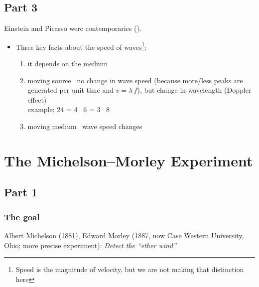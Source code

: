 \documentclass[pagesize,headsepline,10pt,parskip=half]{scrreprt}
\newenvironment{aside}
{\begin{mdframed}[style=0,%
  leftline=false,rightline=false,leftmargin=2em,rightmargin=2em,%
  innerleftmargin=0pt,innerrightmargin=0pt,linewidth=0.75pt,%
  skipabove=7pt,skipbelow=7pt]\small}
{\end{mdframed}}
\begin{document}
      \subsection{Part 3}
        \begin{aside}
          Einstein and Picasso were contemporaries (\cite{miller2008einstein}).
        \end{aside}
        \begin{itemize}
          \item Three key facts about the speed of waves\footnote{Speed is the magnitude of velocity, but we are not making that distinction here}:
            \begin{enumerate}
              \item it depends on the medium
              \item moving source \rightarrow~no change in wave speed
                (because more/less peaks are generated per unit time
                and $v = \lambda \, f$), but change in wavelength (Doppler effect)\\
                example: 24 = 4 \times \, 6 = 3 \times \, 8
              \item moving medium \rightarrow~wave speed changes
            \end{enumerate}
        \end{itemize}

    \clearpage
    \section{The Michelson–Morley Experiment}
      \subsection{Part 1}
        \subsubsection{The goal}
          Albert Michelson (1881), Edward Morley (1887, now Case Western University, Ohio; more precise experiment):
          \emph{Detect the “ether wind”}
\end{document}
